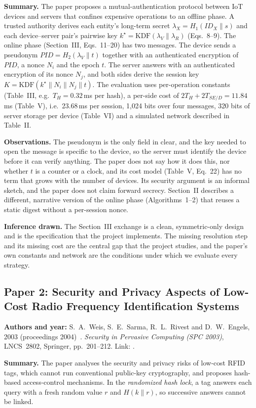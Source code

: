 \textbf{Summary.} The paper proposes a mutual-authentication protocol between IoT devices and servers that confines expensive operations to an offline phase. A trusted authority derives each entity's long-term secret $\lambda_X=H_1(ID_X\|s)$ and each device--server pair's pairwise key $k^\star=\mathrm{KDF}(\lambda_V\|\lambda_R)$ (Eqs.~8--9). The online phase (Section~III, Eqs.~11--20) has two messages. The device sends a pseudonym $PID=H_2(\lambda_V\|t)$ together with an authenticated encryption of $PID$, a nonce $N_i$ and the epoch $t$. The server answers with an authenticated encryption of its nonce $N_j$, and both sides derive the session key $K=\mathrm{KDF}(k^\star\|N_i\|N_j\|t)$. The evaluation uses per-operation constants (Table~III, e.g.\ $T_H=0.32$\,ms per hash), a per-side cost of $2T_H+2T_{SE/D}=11.84$\,ms (Table~V), i.e.\ 23.68\,ms per session, 1,024 bits over four messages, 320 bits of server storage per device (Table~VI) and a simulated network described in Table~II.

\textbf{Observations.} The pseudonym is the only field in clear, and the key needed to open the message is specific to the device, so the server must identify the device before it can verify anything. The paper does not say how it does this, nor whether $t$ is a counter or a clock, and its cost model (Table~V, Eq.~22) has no term that grows with the number of devices. Its security argument is an informal sketch, and the paper does not claim forward secrecy. Section~II describes a different, narrative version of the online phase (Algorithms~1--2) that reuses a static digest without a per-session nonce.

\textbf{Inference drawn.} The Section~III exchange is a clean, symmetric-only design and is the specification that the project implements. The missing resolution step and its missing cost are the central gap that the project studies, and the paper's own constants and network are the conditions under which we evaluate every strategy.

\subsection*{Paper 2: Security and Privacy Aspects of Low-Cost Radio Frequency Identification Systems}
\textbf{Authors and year:} S.~A.~Weis, S.~E.~Sarma, R.~L.~Rivest and D.~W.~Engels, 2003 (proceedings 2004)~\cite{weis}. \emph{Security in Pervasive Computing (SPC 2003)}, LNCS~2802, Springer, pp.~201--212. Link: .

\textbf{Summary.} The paper analyses the security and privacy risks of low-cost RFID tags, which cannot run conventional public-key cryptography, and proposes hash-based access-control mechanisms. In the \emph{randomized hash lock}, a tag answers each query with a fresh random value $r$ and $H(k\|r)$, so successive answers cannot be linked.

